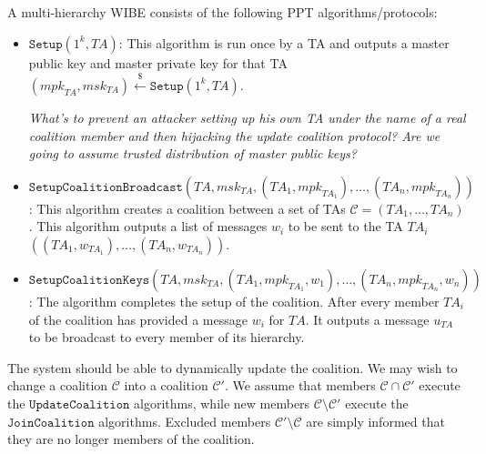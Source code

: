 \documentclass[10pt]{article}
\newcommand{\TA}{\mathit{TA}}
\newcommand{\mpk}{\mathit{mpk}}
\newcommand{\msk}{\mathit{msk}}
\newcommand{\getsr}{\stackrel{{\scriptscriptstyle\$}}{\gets}}
\begin{document}
A multi-hierarchy WIBE consists of the following PPT
algorithms/protocols:
\begin{itemize}
\item $\texttt{Setup}(1^{k},\TA)$: This algorithm is run
once by a TA and outputs a master public key and master private key
for that TA $(\mpk_{\TA},\msk_{\TA})\getsr
\texttt{Setup}(1^{k},\TA)$. \medskip

\emph{What's to prevent an attacker setting up his own TA under the
name of a real coalition member and then hijacking the update
coalition protocol? Are we going to assume trusted distribution of
master public keys?}\medskip

\item
$\texttt{SetupCoalitionBroadcast}(\TA,\msk_{\TA},(\TA_{1},\mpk_{\TA_{1}}),\ldots,
(\TA_{n},\mpk_{\TA_{n}}))$: This algorithm creates a coalition
between a set of TAs $\mathcal{C} = (\TA_{1},\ldots,\TA_{n})$. This
algorithm outputs a list of messages $w_{i}$ to be sent to the TA
$\TA_{i}$
$((\TA_{1},w_{\TA_{1}}),\ldots,(\TA_{n},w_{\TA_{n}}))$.\medskip

\item $\texttt{SetupCoalitionKeys}(\TA,\msk_{\TA},(\TA_{1},\mpk_{\TA_{1}},w_{1}),\ldots,
(\TA_{n},\mpk_{\TA_{n}},w_{n}))$: The algorithm completes the setup
of the coalition. After every member $\TA_{i}$ of the coalition has
provided a message $w_{i}$ for $\TA$. It outputs a message $u_{\TA}$
to be broadcast to every member of its hierarchy.
\end{itemize}
The system should be able to dynamically update the coalition. We
may wish to change a coalition $\mathcal{C}$ into a coalition
$\mathcal{C}'$. We assume that members $\mathcal{C} \cap
\mathcal{C}'$ execute the $\texttt{UpdateCoalition}$ algorithms,
while new members $\mathcal{C}\setminus \mathcal{C}'$ execute the
$\texttt{JoinCoalition}$ algorithms. Excluded members
$\mathcal{C}'\setminus \mathcal{C}$ are simply informed that they
are no longer members of the coalition.
\end{document}

